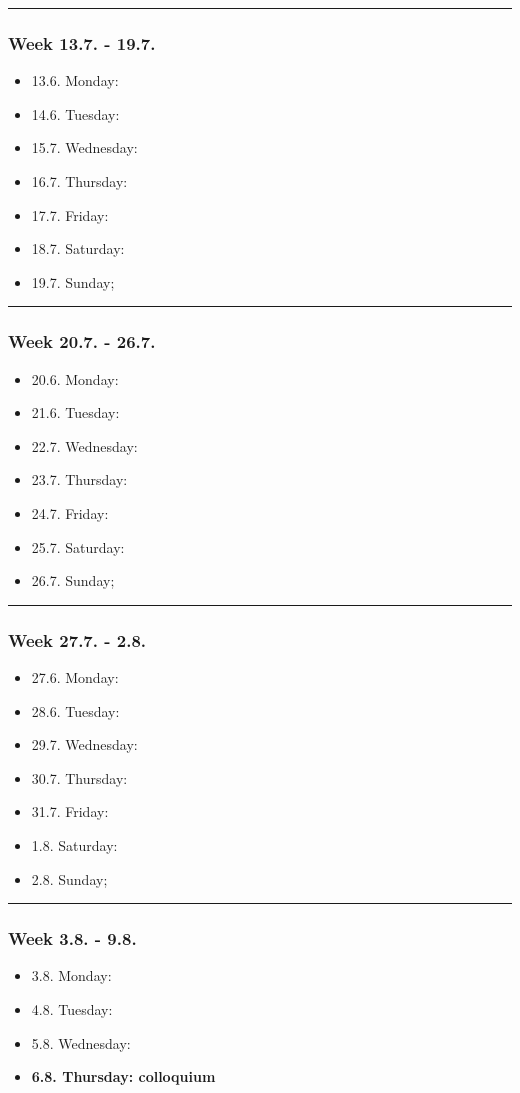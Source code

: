 \hrule
\subsubsection*{Week 13.7. - 19.7.}
\begin{itemize}
  \item 13.6. Monday:
  \item 14.6. Tuesday:
  \item 15.7. Wednesday:
  \item 16.7. Thursday:
  \item 17.7. Friday:
  \item 18.7. Saturday:
  \item 19.7. Sunday;
\end{itemize}

\clearpage
\hrule
\subsubsection*{Week 20.7. - 26.7.}
\begin{itemize}
  \item 20.6. Monday:
  \item 21.6. Tuesday:
  \item 22.7. Wednesday:
  \item 23.7. Thursday:
  \item 24.7. Friday:
  \item 25.7. Saturday:
  \item 26.7. Sunday;
\end{itemize}

\hrule
\subsubsection*{Week 27.7. - 2.8.}
\begin{itemize}
  \item 27.6. Monday:
  \item 28.6. Tuesday:
  \item 29.7. Wednesday:
  \item 30.7. Thursday:
  \item 31.7. Friday:
  \item  1.8. Saturday:
  \item  2.8. Sunday;
\end{itemize}

\hrule
\subsubsection*{Week 3.8. - 9.8.}
\begin{itemize}
  \item  3.8. Monday:
  \item  4.8. Tuesday:
  \item  5.8. Wednesday:
  \item \textbf{6.8. Thursday: colloquium}
\end{itemize}
